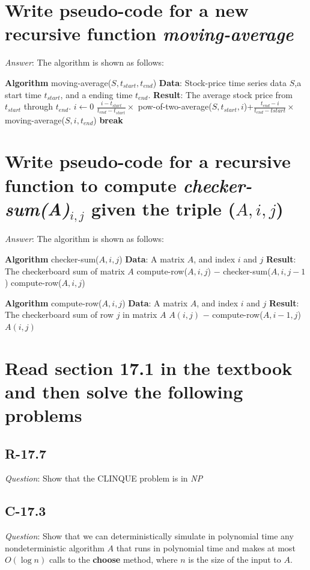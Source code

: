 \documentclass[11pt]{article}
\begin{document}
\section{Write pseudo-code for a new recursive function \emph{moving-average}}
	\emph{Answer}: The algorithm is shown as follows:
	\begin{algorithmic}
	\State \textbf{Algorithm} moving-average($S,t_{start},t_{end}$)
	\State \textbf{Data}: Stock-price time series data $S$,a start time $t_{start}$, and a ending time $t_{end}$.
	\State \textbf{Result}: The average stock price from $t_{start}$ through $t_{end}$.
	\State $i\gets0$
		\State {}
	\EndIf
			\State \Return $\frac{i-t_{start}}{t_{end}-t_{start}}\times$ pow-of-two-average($S,t_{start},i$)+$\frac{t_{end}-i}{t_{end}-t{start}}\times$ moving-average($S,i,t_{end}$)
			\State \textbf{break}
		\EndIf
	\EndFor
	\State {}
	\end{algorithmic}
\section{Write pseudo-code for a recursive function to compute \emph{checker-sum(A)$_{i,j}$} given the triple ($A,i,j$)}
	\emph{Answer}: The algorithm is shown as follows:
	\begin{algorithmic}
	\State \textbf{Algorithm} checker-sum($A,i,j$)
	\State \textbf{Data}: A matrix $A$, and index $i$ and $j$
	\State \textbf{Result}: The checkerboard sum of matrix $A$
	\If {$j>1$}
		\State \Return compute-row($A,i,j$) $-$ checker-sum($A,i,j-1$)
	\Else
		\State \Return compute-row($A,i,j$)
	\EndIf
	\end{algorithmic}

	\begin{algorithmic}
	\State \textbf{Algorithm} compute-row($A,i,j$)
	\State \textbf{Data}: A matrix $A$, and index $i$ and $j$
	\State \textbf{Result}: The checkerboard sum of row $j$ in matrix $A$
	\If {$i>1$}
		\State \Return $A(i,j)$ $-$ compute-row($A,i-1,j$)
	\Else
		\State \Return $A(i,j)$
	\EndIf
	\end{algorithmic}
\section{Read section 17.1 in the textbook and then solve the following problems}
\subsection{R-17.7}
	\emph{Question}: Show that the CLINQUE problem is in \emph{NP}
	
\subsection{C-17.3}
	\emph{Question}: Show that we can deterministically simulate in polynomial time any nondeterministic algorithm $A$ that runs in polynomial time and makes at most $O(\log n)$ calls to the \textbf{choose} method, where $n$ is the size of the input to $A$.
\end{document}
